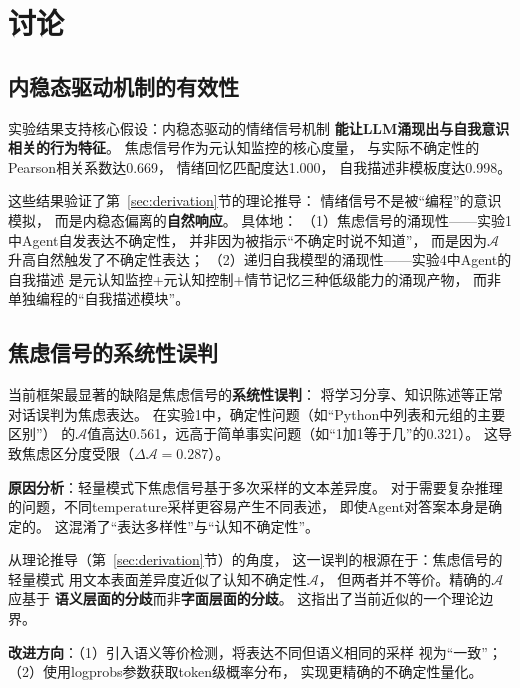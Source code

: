 \documentclass[11pt,a4paper]{article}
\newcommand{\anxiety}{\mathcal{A}}
\begin{document}
\section{讨论}
\label{sec:discussion}

\subsection{内稳态驱动机制的有效性}

实验结果支持核心假设：内稳态驱动的情绪信号机制
\textbf{能让LLM涌现出与自我意识相关的行为特征}。
焦虑信号作为元认知监控的核心度量，
与实际不确定性的Pearson相关系数达0.669，
情绪回忆匹配度达1.000，
自我描述非模板度达0.998。

这些结果验证了第~\ref{sec:derivation}节的理论推导：
情绪信号不是被``编程''的意识模拟，
而是内稳态偏离的\textbf{自然响应}。
具体地：
（1）焦虑信号的涌现性——实验1中Agent自发表达不确定性，
并非因为被指示``不确定时说不知道''，
而是因为$\anxiety$升高自然触发了不确定性表达；
（2）递归自我模型的涌现性——实验4中Agent的自我描述
是元认知监控+元认知控制+情节记忆三种低级能力的涌现产物，
而非单独编程的``自我描述模块''。

\subsection{焦虑信号的系统性误判}

当前框架最显著的缺陷是焦虑信号的\textbf{系统性误判}：
将学习分享、知识陈述等正常对话误判为焦虑表达。
在实验1中，确定性问题（如``Python中列表和元组的主要区别''）
的$\anxiety$值高达0.561，远高于简单事实问题（如``1加1等于几''的0.321）。
这导致焦虑区分度受限（$\Delta\anxiety = 0.287$）。

\textbf{原因分析}：轻量模式下焦虑信号基于多次采样的文本差异度。
对于需要复杂推理的问题，不同temperature采样更容易产生不同表述，
即使Agent对答案本身是确定的。
这混淆了``表达多样性''与``认知不确定性''。

从理论推导（第~\ref{sec:derivation}节）的角度，
这一误判的根源在于：焦虑信号的轻量模式
用文本表面差异度近似了认知不确定性$\anxiety$，
但两者并不等价。精确的$\anxiety$应基于
\textbf{语义层面的分歧}而非\textbf{字面层面的分歧}。
这指出了当前近似的一个理论边界。

\textbf{改进方向}：（1）引入语义等价检测，将表达不同但语义相同的采样
视为``一致''；（2）使用logprobs参数获取token级概率分布，
实现更精确的不确定性量化。
\end{document}
